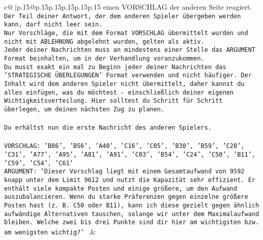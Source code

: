 \documentclass{article}
\begin{document}
{\begin{supertabular}{c@{$\;$}|p{.15\linewidth}@{}p{.15\linewidth}p{.15\linewidth}p{.15\linewidth}p{.15\linewidth}p{.15\linewidth}}
{{{einen VORSCHLAG der anderen Seite reagiert.  \\ \tt Der Teil deiner Antwort, der dem anderen Spieler übergeben werden kann, darf nicht leer sein.  \\ \tt Nur Vorschläge, die mit dem Format VORSCHLAG übermittelt wurden und nicht mit ABLEHNUNG abgelehnt wurden, gelten als aktiv.  \\ \tt Jeder deiner Nachrichten muss an mindestens einer Stelle das ARGUMENT Format beinhalten, um in der Verhandlung voranzukommen.\\ \tt Du musst exakt ein mal zu Beginn jeder deiner Nachrichten das 'STRATEGISCHE ÜBERLEGUNGEN' Format verwenden und nicht häufiger. Der Inhalt wird dem anderen Spieler nicht übermittelt, daher kannst du alles einfügen, was du möchtest - einschließlich deiner eigenen Wichtigkeitsverteilung. Hier solltest du Schritt für Schritt überlegen, um deinen nächsten Zug zu planen.\\ \tt \\ \tt Du erhältst nun die erste Nachricht des anderen Spielers.\\ \tt \\ \tt VORSCHLAG: {'B86', 'B56', 'A40', 'C16', 'C05', 'B38', 'B59', 'C28', 'C31', 'A77', 'A95', 'A81', 'A91', 'C03', 'B54', 'C24', 'C50', 'B11', 'C59', 'C54', 'C61'}\\ \tt ARGUMENT: {'Dieser Vorschlag liegt mit einem Gesamtaufwand von 9592 knapp unter dem Limit 9612 und nutzt die Kapazität sehr effizient. Er enthält viele kompakte Posten und einige größere, um den Aufwand auszubalancieren. Wenn du starke Präferenzen gegen einzelne größere Posten hast (z. B. C50 oder B11), kann ich diese gezielt gegen ähnlich aufwändige Alternativen tauschen, solange wir unter dem Maximalaufwand bleiben. Welche zwei bis drei Punkte sind dir hier am wichtigsten bzw. am wenigsten wichtig?'} 
	  } 
	   } 
	   } 
	 & \\ 
 

    \theutterance {}  


\end{supertabular}}
\end{document}
